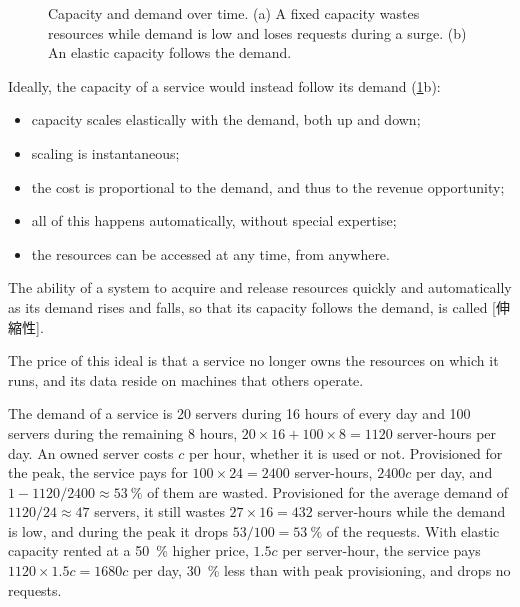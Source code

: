\documentclass[../main.tex]{subfiles}
\begin{document}
\begin{figure}[htbp]
  \centering
  
  \caption{Capacity and demand over time.  (a) A fixed capacity wastes
    resources while demand is low and loses requests during a surge.  (b) An
    elastic capacity follows the demand.}
  \label{fig:l16-capacity}
\end{figure}

Ideally, the capacity of a service would instead follow its demand
(\cref{fig:l16-capacity}b):
\begin{itemize}
  \item capacity scales elastically with the demand, both up and down;
  \item scaling is instantaneous;
  \item the cost is proportional to the demand, and thus to the revenue
    opportunity;
  \item all of this happens automatically, without special expertise;
  \item the resources can be accessed at any time, from anywhere.
\end{itemize}

\begin{definition}[Elasticity]
  The ability of a system to acquire and release resources quickly and
  automatically as its demand rises and falls, so that its capacity follows
  the demand, is called [伸縮性].
\end{definition}

The price of this ideal is that a service no longer owns the resources on
which it runs, and its data reside on machines that others operate.

\begin{example}
  The demand of a service is 20 servers during 16 hours of every day and 100
  servers during the remaining 8 hours, $20 \times 16 + 100 \times 8 = 1120$
  server-hours per day.  An owned server costs $c$ per hour, whether it is
  used or not.  Provisioned for the peak, the service pays for
  $100 \times 24 = 2400$ server-hours, $2400c$ per day, and
  $1 - 1120/2400 \approx \SI{53}{\percent}$ of them are wasted.  Provisioned
  for the average demand of $1120/24 \approx 47$ servers, it still wastes
  $27 \times 16 = 432$ server-hours while the demand is low, and during the
  peak it drops $53/100 = \SI{53}{\percent}$ of the requests.  With elastic
  capacity rented at a \SI{50}{\percent} higher price, $1.5c$ per
  server-hour, the service pays $1120 \times 1.5c = 1680c$ per day,
  \SI{30}{\percent} less than with peak provisioning, and drops no requests.
\end{example}
\end{document}
